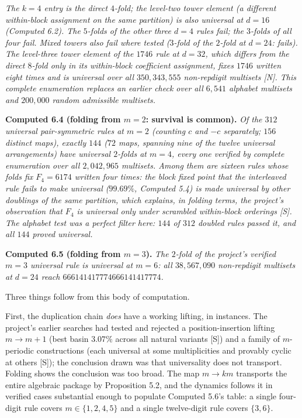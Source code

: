 \documentclass[11pt,letterpaper]{article}
\theoremstyle{paperstyle}
\theoremstyle{paperstyledef}
\theoremstyle{paperstylerem}
\begin{document}
\emph{The \(k = 4\) entry is the direct \(4\)-fold; the level-two tower element (a different within-block assignment on the same partition) is also universal at \(d = 16\) (Computed 6.2). The \(5\)-folds of the other three \(d=4\) rules fail; the \(3\)-folds of all four fail. Mixed towers also fail where tested (\(3\)-fold of the \(2\)-fold at \(d=24\): fails). The level-three tower element of the \(1746\) rule at \(d = 32\), which differs from the direct \(8\)-fold only in its within-block coefficient assignment, fixes \(1746\) written eight times and is universal over all \(350{,}343{,}555\) non-repdigit multisets {[}N{]}. This complete enumeration replaces an earlier check over all \(6{,}541\) alphabet multisets and \(200{,}000\) random admissible multisets.}

\textbf{Computed 6.4 (folding from \(m = 2\): survival is common).} \emph{Of the \(312\) universal pair-symmetric rules at \(m = 2\) (counting \(c\) and \(-c\) separately; \(156\) distinct maps), exactly \(144\) (\(72\) maps, spanning nine of the twelve universal arrangements) have universal \(2\)-folds at \(m = 4\), every one verified by complete enumeration over all \(2{,}042{,}965\) multisets. Among them are sixteen rules whose folds fix \(F_4 = 6174\) written four times: the block fixed point that the interleaved rule fails to make universal (\(99.69\%\), Computed 5.4) is made universal by other doublings of the same partition, which explains, in folding terms, the project's observation that \(F_4\) is universal only under scrambled within-block orderings {[}S{]}. The alphabet test was a perfect filter here: \(144\) of \(312\) doubled rules passed it, and all \(144\) proved universal.}

\textbf{Computed 6.5 (folding from \(m = 3\)).} \emph{The \(2\)-fold of the project's verified \(m = 3\) universal rule is universal at \(m = 6\): all \(38{,}567{,}090\) non-repdigit multisets at \(d = 24\) reach \(666141417774666141417774\).}

Three things follow from this body of computation.

First, the duplication chain \emph{does} have a working lifting, in instances. The project's earlier searches had tested and rejected a position-insertion lifting \(m \to m+1\) (best basin \(3.07\%\) across all natural variants {[}S{]}) and a family of \(m\)-periodic constructions (each universal at some multiplicities and provably cyclic at others {[}S{]}); the conclusion drawn was that universality does not transport. Folding shows the conclusion was too broad. The map \(m \to km\) transports the entire algebraic package by Proposition 5.2, and the dynamics follows it in verified cases substantial enough to populate Computed 5.6's table: a single four-digit rule covers \(m \in \{1, 2, 4, 5\}\) and a single twelve-digit rule covers \(\{3, 6\}\).
\end{document}
